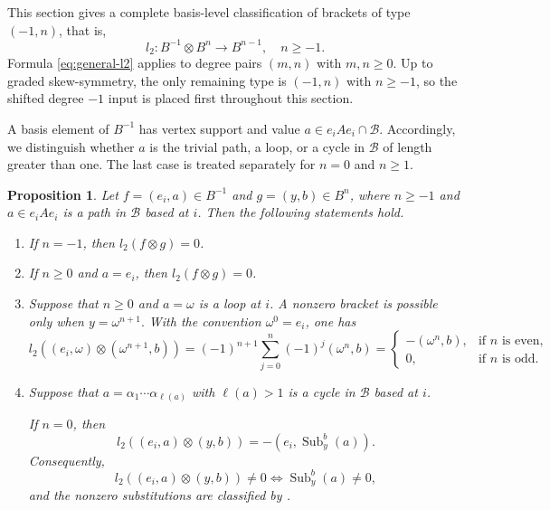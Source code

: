 \documentclass[11pt,a4paper,reqno]{amsart}
\newcommand{\mB}{\mathcal B}
\newcommand{\Sub}{\operatorname{Sub}}
\newcommand{\para}[2]{(#1,#2)}
\theoremstyle{plain}
\newtheorem{proposition}[proposition]{Proposition}
\theoremstyle{definition}
\numberwithin{equation}{section}
\begin{document}
	This section gives a complete basis-level classification of brackets of type
	$(-1,n)$, that is,
	\[
	l_2:B^{-1}\otimes B^n\longrightarrow B^{n-1},\quad n\geq-1.
	\]
	Formula \eqref{eq:general-l2} applies to degree pairs $(m,n)$ with
	$m,n\geq0$.  Up to graded skew-symmetry, the only remaining type is
	$(-1,n)$ with $n\geq-1$, so the shifted degree $-1$ input is placed first
	throughout this section.
	
	A basis element of $B^{-1}$ has vertex support and value
	$a\in e_iAe_i\cap\mB$.  Accordingly, we distinguish whether $a$ is the
	trivial path, a loop, or a cycle in $\mB$ of length greater than one.  The
	last case is treated separately for $n=0$ and $n\geq1$.
	
	\begin{proposition}
		\label{prop:degree-minus-one-brackets}
		Let $f=\para{e_i}{a}\in B^{-1}$ and
		$g=\para{y}{b}\in B^n$, where $n\geq-1$ and $a\in e_iAe_i$ is a path in $\mB$ based at $i$. Then the following
		statements hold.
		
		\begin{enumerate}
			\item If $n=-1$, then $l_2(f\otimes g)=0$.
			
			
			\item If $n\geq0$ and $a=e_i$, then $l_2(f\otimes g)=0$.
			
			\item Suppose that $n\geq0$ and $a=\omega$ is a loop at $i$.
			A nonzero bracket is possible only when
			$
			y=\omega^{n+1}.
			$
			With the convention $\omega^0=e_i$, one has
			\[
			l_2(
			\para{e_i}{\omega}
			\otimes
			\para{\omega^{n+1}}{b}
			)
			=
			(-1)^{n+1}
			\sum_{j=0}^{n}
			(-1)^j
			\para{\omega^n}{b}
			=
			\begin{cases}
				-\para{\omega^n}{b},
				& \text{if } n\text{ is even},\\
				0,
				& \text{if } n\text{ is odd}.
			\end{cases}
			\]
			
			\item Suppose that
			$a=\alpha_1\cdots\alpha_{\ell(a)}$ with
			$\ell(a)>1$
			is a cycle in $\mB$ based at $i$.
			
			If $n=0$, then
			\[
			l_2(
			\para{e_i}{a}
			\otimes
			\para{y}{b}
			)
			=
			-\para{e_i}{\Sub_y^b(a)}.
			\]
			Consequently,
			\[
			l_2(
			\para{e_i}{a}
			\otimes
			\para{y}{b}
			)\neq0
			\Longleftrightarrow
			\Sub_y^b(a)\neq0,
			\]
			and the nonzero substitutions are classified by
			.
			

\end{enumerate}
\end{proposition}
\end{document}
